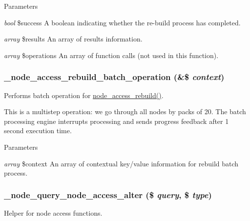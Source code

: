 \begin{DoxyParams}{Parameters}
\item[{\em bool}]\$success A boolean indicating whether the re-\/build process has completed. \item[{\em array}]\$results An array of results information. \item[{\em array}]\$operations An array of function calls (not used in this function). \end{DoxyParams}
\hypertarget{group__node__access_ga2b720b31a5b728b16c357ab995deb5d5}{
\subsubsection[{\_\-node\_\-access\_\-rebuild\_\-batch\_\-operation}]{\setlength{\rightskip}{0pt plus 5cm}\_\-node\_\-access\_\-rebuild\_\-batch\_\-operation (\&\$ {\em context})}}
\label{group__node__access_ga2b720b31a5b728b16c357ab995deb5d5}
Performs batch operation for \hyperlink{group__node__access_gaf04007aedfc3afbe074b2fe4065ab618}{node\_\-access\_\-rebuild()}.

This is a multistep operation: we go through all nodes by packs of 20. The batch processing engine interrupts processing and sends progress feedback after 1 second execution time.


\begin{DoxyParams}{Parameters}
\item[{\em array}]\$context An array of contextual key/value information for rebuild batch process. \end{DoxyParams}
\hypertarget{group__node__access_ga5f4838d9b5cac9f3bee9a26f39e80691}{
\subsubsection[{\_\-node\_\-query\_\-node\_\-access\_\-alter}]{\setlength{\rightskip}{0pt plus 5cm}\_\-node\_\-query\_\-node\_\-access\_\-alter (\$ {\em query}, \/  \$ {\em type})}}
\label{group__node__access_ga5f4838d9b5cac9f3bee9a26f39e80691}
Helper for node access functions.


